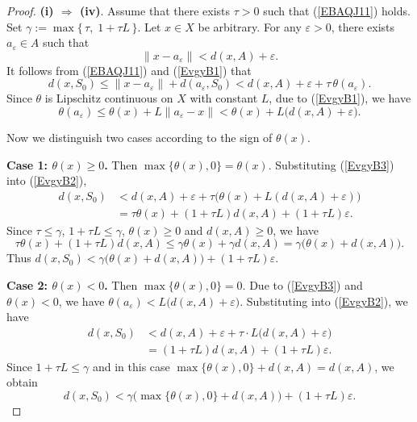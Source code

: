 \documentclass[10pt,a4paper]{amsart}
\begin{document}
\begin{proof}
	
	\noindent\textbf{(i) $\Rightarrow$ (iv)}.
	Assume  that   there exists $\tau>0$ such that  (\ref{EBAQJ11}) holds.
	Set  
	$ \gamma := \max\{\,\tau,\;1+\tau L\,\}.$
	Let  $x\in X$      be arbitrary.   For   any    $\varepsilon>0$,  there exists $a_\varepsilon\in A$ such that
	\begin{equation}\label{EvgyB1}	\|x-a_\varepsilon\| < d(x, A)+\varepsilon  .        
	\end{equation}
	It follows from    (\ref{EBAQJ11})   and  (\ref{EvgyB1})    that   
	\begin{equation}\label{EvgyB2}
		d(x,S_0) \le \|x-a_\varepsilon\| + d(a_\varepsilon,S_0) < d(x, A)+\varepsilon + \tau\,\theta(a_\varepsilon) .
	\end{equation}
	Since  \(\theta\) is Lipschitz continuous on \(X\) with constant \(L\),  due to (\ref{EvgyB1}),  we have
	\begin{equation} \label{EvgyB3}
		\theta(a_\varepsilon) \le \theta(x) + L\|a_\varepsilon-x\| 
		< \theta(x) + L\bigl(d(x, A) + \varepsilon\bigr).  
	\end{equation}
	
	Now we distinguish two cases according to the sign of $\theta(x)$.
	
	\noindent\textbf{Case 1: $\theta(x)\ge 0$.}
	Then $\max\{\theta(x),0\}=\theta(x)$. Substituting (\ref{EvgyB3}) into (\ref{EvgyB2}),
	\[
	\begin{aligned}
		d(x,S_0) &< d(x, A)+\varepsilon + \tau\bigl(\theta(x)+L(d(x, A)+\varepsilon)\bigr) \\
		&= \tau\theta(x) + (1+\tau L)d(x, A) + (1+\tau L)\varepsilon.
	\end{aligned}
	\]
	Since $\tau\le\gamma$, $1+\tau L\le\gamma$,     $\theta(x)\ge0$  and  $  d(x, A)\ge0$, we have
	\[
	\tau\theta(x) + (1+\tau L) d(x, A) \le \gamma\theta(x) + \gamma d(x, A) = \gamma\bigl(\theta(x)+d(x, A)\bigr).
	\]
	Thus
	$	d(x,S_0) < \gamma\bigl(\theta(x)+d(x, A) \bigr) + (1+\tau L)\varepsilon.$
	
	\noindent\textbf{Case 2: $\theta(x)<0$.}
	Then $\max\{\theta(x),0\}=0$. Due to (\ref{EvgyB3})  and   $\theta(x)<0$, we have
	$\theta(a_\varepsilon) < L\bigl(d(x, A)+\varepsilon\bigr)$.
	Substituting into (\ref{EvgyB2}), we have
	\[
	\begin{aligned}
		d(x,S_0) &< d(x, A) +\varepsilon + \tau \cdot L\bigl(d(x, A) +\varepsilon\bigr) \\
		&= (1+\tau L)d(x, A) + (1+\tau L)\varepsilon.
	\end{aligned}
	\]
	Since $1+\tau L\le\gamma$ and in this case $\max\{\theta(x),0\}+d(x, A) = d(x, A)$, we obtain
	\[
	d(x,S_0) < \gamma\bigl(\max\{\theta(x),0\}+d(x, A) \bigr) + (1+\tau L)\varepsilon.
	\]
	

\end{proof}
\end{document}
